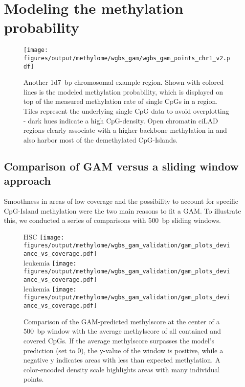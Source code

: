 \chapter{Modeling the methylation probability} 
\enlargethispage{\baselineskip}
\begin{figure}[!htb]
	\vspace{-3em}
	\centering
	\texttt{[image: figures/output/methylome/wgbs\_gam/wgbs\_gam\_points\_chr1\_v2.pdf]}
	\caption[Modeled methylation within an annotated sample region on chr1]{Another \SI{1d7}{bp} chromosomal example region. Shown with colored lines is the modeled methylation probability, which is displayed on top of the measured methylation rate of single CpGs in a region. Tiles represent the underlying single CpG data to avoid overplotting - dark hues indicate a high CpG-density. Open chromatin ciLAD regions clearly associate with a higher backbone methylation in \dnmtchip \kitpos and also harbor most of the demethylated CpG-Islands.}
	\label{fig:wgbs_gam_points_chr1.pdf}
\end{figure}

\setcounter{section}{2}
\section{Comparison of GAM versus a sliding window approach}
\label{chap:r:gam:gamvssliding}

Smoothness in areas of low coverage and the possibility to account for specific CpG-Island methylation were the two main reasons to fit a GAM. To illustrate this, we conducted a series of comparisons with \SI{500}{bp} sliding windows. 

\begin{figure}[!ht]
	\centering \dnmtwt HSC
	\texttt{[image: figures/output/methylome/wgbs\_gam\_validation/gam\_plots\_deviance\_vs\_coverage.pdf]} 
	\vspace{0.1em} \\ \dnmtwt \kitpos leukemia	\texttt{[image: figures/output/methylome/wgbs\_gam\_validation/gam\_plots\_deviance\_vs\_coverage.pdf]}
	\vspace{0.1em} \\ \dnmtchip \kitpos leukemia \texttt{[image: figures/output/methylome/wgbs\_gam\_validation/gam\_plots\_deviance\_vs\_coverage.pdf]}
	\caption{Comparison of the GAM-predicted methylscore at the center of a \SI{500}{bp} window with the average methylscore of all contained and covered CpGs. If the average methylscore surpasses the model's prediction (set to 0), the y-value of the window is positive, while a negative y indicates areas with less than expected methylation. A color-encoded density scale highlights areas with many individual points.}
	\label{fig:wgbs_gam_validation1}
\end{figure}\clearpage

